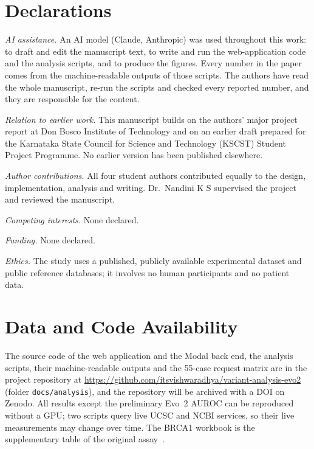\documentclass[10pt,journal,a4paper]{IEEEtran}
\begin{document}
\section*{Declarations}
\textit{AI assistance.} An AI model (Claude, Anthropic) was used throughout this work: to draft and edit the manuscript text, to write and run the web-application code and the analysis scripts, and to produce the figures. Every number in the paper comes from the machine-readable outputs of those scripts. The authors have read the whole manuscript, re-run the scripts and checked every reported number, and they are responsible for the content.

\textit{Relation to earlier work.} This manuscript builds on the authors' major project report at Don Bosco Institute of Technology and on an earlier draft prepared for the Karnataka State Council for Science and Technology (KSCST) Student Project Programme. No earlier version has been published elsewhere.

\textit{Author contributions.} All four student authors contributed equally to the design, implementation, analysis and writing. Dr.\ Nandini K S supervised the project and reviewed the manuscript.

\textit{Competing interests.} None declared.

\textit{Funding.} None declared.

\textit{Ethics.} The study uses a published, publicly available experimental dataset and public reference databases; it involves no human participants and no patient data.

\section*{Data and Code Availability}
The source code of the web application and the Modal back end, the analysis scripts, their machine-readable outputs and the 55-case request matrix are in the project repository at \url{https://github.com/itsvishwaradhya/variant-analysis-evo2} (folder \texttt{docs/analysis}), and the repository will be archived with a DOI on Zenodo. %
All results except the preliminary Evo~2 AUROC can be reproduced without a GPU; two scripts query live UCSC and NCBI services, so their live measurements may change over time. The BRCA1 workbook is the supplementary table of the original assay~\cite{findlay2018brca1}.
\end{document}
